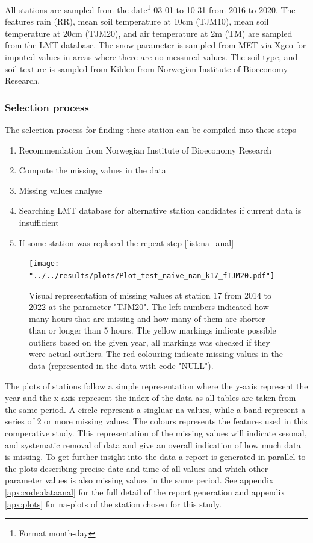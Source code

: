All stations are sampled from the date\footnote{Format month-day} 03-01 to 10-31 from 2016 to 2020. The features rain (RR), mean soil temperature at 10cm (TJM10), mean soil temperature at 20cm (TJM20), and air temperature at 2m (TM) are sampled from the LMT database. The snow parameter is sampled from MET via Xgeo for imputed values in areas where there are no messured values. The soil type, and soil texture is sampled from Kilden from Norwegian Institute of Bioeconomy Research.

\subsubsection{Selection process}
The selection process for finding these station can be compiled into these steps

\begin{enumerate}
	\item Recommendation from Norwegian Institute of Bioeconomy Research
	\item \label{list:na_anal}Compute the missing values in the data
	\item Missing values analyse 
	\item Searching LMT database for alternative station candidates if current data is insufficient
	\item If some station was replaced the repeat step \ref{list:na_anal}
\end{enumerate}

\begin{figure}
	\centering
	\label{fig:plot-17}
	\texttt{[image: "../../results/plots/Plot\_test\_naive\_nan\_k17\_fTJM20.pdf"]}
	\caption[Visual representation of station 17]{Visual representation of missing values at station 17 from 2014 to 2022 at the parameter "TJM20". The left numbers indicated how many hours that are missing and how many of them are shorter than or longer than 5 hours. The yellow markings indicate possible outliers based on the given year, all markings was checked if they were actual outliers. The red colouring indicate missing values in the data (represented in the data with code "NULL").}
\end{figure}

The plots of stations follow a simple representation where the y-axis represent the year and the x-axis represent the index of the data as all tables are taken from the same period. A circle represent a singluar na values, while a band represent a series of 2 or more missing values. The colours represents the features used in this comperative study. This representation of the missing values will indicate sesonal, and systematic removal of data and give an overall indication of how much data is missing. To get further insight into the data a report is generated in parallel to the plots describing precise date and time of all values and which other parameter values is also missing values in the same period. See appendix \ref{apx:code:dataanal} for the full detail of the report generation and appendix \ref{apx:plots} for na-plots of the station chosen for this study.

